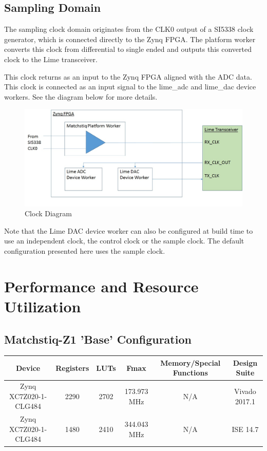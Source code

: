 \documentclass{article}
\begin{document}
\subsection*{Sampling Domain}
The sampling clock domain originates from  the CLK0 output of a SI5338 clock generator, which is connected directly to the Zynq FPGA. The platform worker converts this clock from differential to single ended and outputs this converted clock to the Lime transceiver.\par\medskip
\noindent This clock returns as an input to the Zynq FPGA aligned with the ADC data. This clock is connected as an input signal to the lime\_adc and lime\_dac device workers. See the diagram below for more details.\par\medskip
\begin{figure}[ht]
	\centerline{\includegraphics[scale=0.5]{matchstiq_sample_clock_diagram}}
	\caption{Clock Diagram}
	\label{fig:clk}
\end{figure}
\noindent Note that the Lime DAC device worker can also be configured at build time to use an independent clock, the control clock or the sample clock. The default configuration presented here uses the sample clock.
\newpage

\section*{Performance and Resource Utilization}
\subsection*{Matchstiq-Z1 'Base' Configuration}
\begin{scriptsize}
	\begin{tabular}{|c|c|c|c|c|c|}
		\hline
		\rowcolor{blue}
		Device                & Registers & LUTs & Fmax        & Memory/Special Functions & Design Suite \\
		\hline
		Zynq XC7Z020-1-CLG484 & 2290      & 2702 & 173.973 MHz & N/A                      & Vivado 2017.1    \\
		\hline
		Zynq XC7Z020-1-CLG484 & 1480      & 2410 & 344.043 MHz & N/A                      & ISE 14.7     \\
		\hline
	\end{tabular}
\end{scriptsize}
\end{document}
